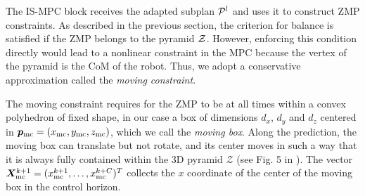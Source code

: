 The IS-MPC block receives the adapted subplan ${\cal P}^l$ and uses it to construct ZMP constraints. As described in the previous section, the criterion for balance is satisfied if the ZMP belongs to the pyramid $\cal Z$. However, enforcing this condition directly would lead to a nonlinear constraint in the MPC because the vertex of the pyramid is the CoM of the robot. Thus, we adopt a conservative approximation called the {\em moving constraint}.

The moving constraint requires for the ZMP to be at all times within a convex polyhedron of fixed shape, in our case a box of dimensions $d_x$, $d_y$ and $d_z$ centered in ${\bm{p}}_{\rm mc}=(x_{\rm mc}, y_{\rm mc}, z_{\rm mc})$, which we call the {\em moving box}. Along the prediction, the moving box can translate but not rotate, and its center moves in such a way that it is always fully contained within the 3D pyramid $\mathcal{Z}$ (see Fig. 5 in \cite{Zamparelli2018SYROCO}). The vector $\bm{X}_{\rm mc}^{k+1} = (x_{\rm mc}^{k+1}, \dots, x_{\rm mc}^{k+C})^T$ collects the $x$ coordinate of the center of the moving box in the control horizon.

